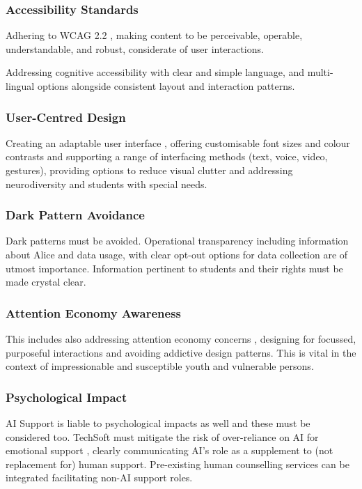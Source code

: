 \documentclass[14pt,a4paper]{article}
\begin{document}
\begin{multicols}{2}
\subsubsection{Accessibility Standards}
Adhering to WCAG 2.2 \textit{\parencite{W3C2023}}, making content to be perceivable, operable, understandable, and robust, considerate of user interactions.

Addressing cognitive accessibility \textit{\parencite[pp. 1-10]{Yesilada2023}} with clear and simple language, and multi-lingual options \textit{\parencite[pp. 50-100]{AnastasiouSchaler2023}} alongside consistent layout and interaction patterns.

\subsubsection{User-Centred Design}
Creating an adaptable user interface \textit{\parencite[pp. 20-50]{HarperYesilada2024}}, offering customisable font sizes and colour contrasts and supporting a range of interfacing methods (text, voice, video, gestures), providing options to reduce visual clutter and addressing neurodiversity \textit{\parencite[pp. 30-60]{Armstrong2023}} and students with special needs.

\subsubsection{Dark Pattern Avoidance}
Dark patterns \textit{\parencite{Brignull2023}} must be avoided.
Operational transparency including information about Alice and data usage, with clear opt-out options for data collection are of utmost importance. Information pertinent to students and their rights must be made crystal clear.

\subsubsection{Attention Economy Awareness}
This includes also addressing attention economy concerns \textit{\parencite[pp. 10-30]{Williams2024}}, designing for focussed, purposeful interactions and avoiding addictive design patterns. This is vital in the context of impressionable and susceptible youth and vulnerable persons.

\subsubsection{Psychological Impact}
AI Support is liable to psychological impacts as well and these must be considered  too. TechSoft must mitigate the risk of over-reliance on AI for emotional support \textit{\parencite[p. 746]{Miner2022}}, clearly communicating AI's role as a supplement to (not replacement for) human support. Pre-existing human counselling services can be integrated facilitating non-AI support roles.


\end{multicols}
\end{document}
